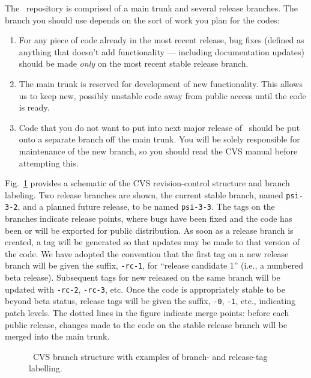 The \PSIthree\ repository is comprised of a main trunk and several
release branches.  The branch you should use depends on the sort of 
work you plan for the codes:
\begin{enumerate}
\item For any piece of code already in the most recent release, bug
fixes (defined as anything that doesn't add functionality --- including
documentation updates) should be made {\em only} on the most recent stable
release branch.
\item The main trunk is reserved for development of new functionality.
This allows us to keep new, possibly unstable code away from public
access until the code is ready.
\item Code that you do not want to put into next major release of \PSIthree\
should be put onto a separate branch off the main trunk. You will be
solely responsible for maintenance of the new branch, so you should read
the CVS manual before attempting this.
\end{enumerate}

\noindent Fig.~\ref{Fig:cvs} provides a schematic of the CVS revision-control
structure and branch labeling.  Two release branches are shown, the current
stable branch, named {\tt psi-3-2}, and a planned future release, to be
named {\tt psi-3-3}.  The tags on the branches indicate release points,
where bugs have been fixed and the code has been or will be exported for
public distribution.  As soon as a release branch is created, a tag will
be generated so that updates may be made to that version of the code.
We have adopted the convention that the first tag on a new release branch
will be given the suffix, {\tt -rc-1}, for ``release candidate 1'' (i.e.,
a numbered beta release).  Subsequent tags for new released on the same
branch will be updated with {\tt -rc-2}, {\tt -rc-3}, etc.  Once the
code is appropriately stable to be beyond beta status, release tags will
be given the suffix, {\tt -0}, {\tt -1}, etc., indicating patch levels.
The dotted lines in the figure indicate merge points: before each public
release, changes made to the code on the stable release branch will be
merged into the main trunk.

\begin{figure}[h]
\begin{center}
\end{center}
\caption{\PSIthree\ CVS branch structure with examples of branch- and
release-tag labelling.}
\label{Fig:cvs}
\end{figure}

